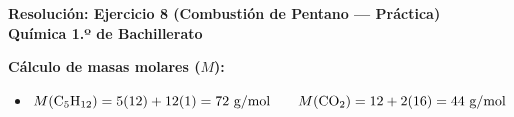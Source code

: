 \documentclass[11pt,a4paper]{article}
\begin{document}
\newpage

\begin{center}
    {\LARGE \textbf{Resolución: Ejercicio 8 (Combustión de Pentano — Práctica)}}\\[4pt]
    {\large \textbf{Química 1.º de Bachillerato}}
\end{center}

\vspace{0.3cm}
\noindent\textbf{Cálculo de masas molares ($M$):}
\begin{itemize}[leftmargin=1.5em, itemsep=2pt]
    \item $M(\ce{C5H12}) = 5(12) + 12(1) = 72\text{ g/mol} \qquad M(\ce{CO2}) = 12 + 2(16) = 44\text{ g/mol}$
\end{itemize}
\end{document}
